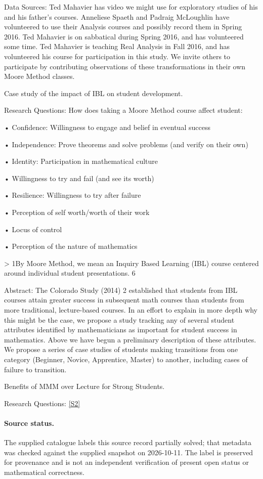 \documentclass[11pt]{article}
\newcommand{\sref}[2]{\hyperlink{source:#1:#2}{[S#2]}}
\begin{document}
Data Sources: Ted Mahavier has video we might use for exploratory studies of his and his father's courses. Anneliese Spaeth and Padraig McLoughlin have volunteered to use their Analysis courses and possibly record them in Spring 2016. Ted Mahavier is on sabbatical during Spring 2016, and has volunteered some time. Ted Mahavier is teaching Real Analysis in Fall 2016, and has volunteered his course for participation in this study. We invite others to participate by contributing observations of these transformations in their own Moore Method classes.

Case study of the impact of IBL on student development.

Research Questions: How does taking a Moore Method course affect student:

• Confidence: Willingness to engage and belief in eventual success

• Independence: Prove theorems and solve problems (and verify on their own)

• Identity: Participation in mathematical culture

• Willingness to try and fail (and see its worth)

• Resilience: Willingness to try after failure

• Perception of self worth/worth of their work

• Locus of control

• Perception of the nature of mathematics

> 1By Moore Method, we mean an Inquiry Based Learning (IBL) course centered around individual student presentations. 6

Abstract: The Colorado Study (2014) 2 established that students from IBL courses attain greater success in subsequent math courses than students from more traditional, lecture-based courses. In an effort to explain in more depth why this might be the case, we propose a study tracking any of several student attributes identified by mathematicians as important for student success in mathematics. Above we have begun a preliminary description of these attributes. We propose a series of case studies of students making transitions from one category (Beginner, Novice, Apprentice, Master) to another, including cases of failure to transition.

Benefits of MMM over Lecture for Strong Students.

Research Questions: \sref{20002205}{2}
\paragraph{Source status.}
The supplied catalogue labels this source record partially solved; that metadata was checked against the supplied snapshot on 2026-10-11. The label is preserved for provenance and is not an independent verification of present open status or mathematical correctness.
\end{document}
